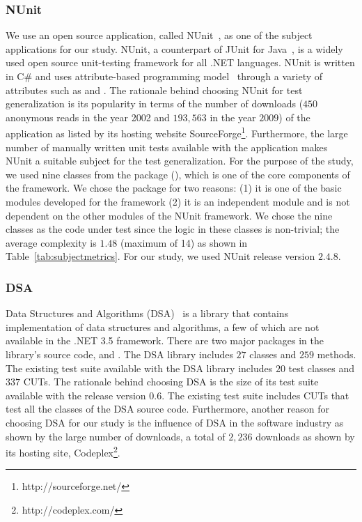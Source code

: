 \subsubsection{NUnit}
\label{sec:nunit}
We use an open source application, called NUnit~\cite{nunit}, as one of the subject applications for our study. NUnit, a counterpart of JUnit for Java~\cite{JUnit}, is a widely used open source unit-testing framework for all .NET languages. NUnit is written in C\# and uses attribute-based programming model~\cite{TDD} through a variety of attributes such as \CodeIn{[TestFixture]} and \CodeIn{[Test]}. The rationale behind choosing NUnit for test generalization is its popularity in terms of the number of downloads ($450$ anonymous reads in the year 2002 and $193,563$ in the year $2009$) of the application as listed by its hosting website SourceForge\footnote{http://sourceforge.net/}. Furthermore, the large number of manually written unit tests available with the application makes NUnit a suitable subject for the test generalization. For the purpose of the study, we used nine classes from the  package (), which is one of the core components of the framework. We chose the  package for two reasons: (1) it is one of the basic modules developed for the framework (2) it is an independent module and is not dependent on the other modules of the NUnit framework. We chose the nine classes as the code under test since the logic in these classes is non-trivial; the average complexity is $1.48$ (maximum of 14) as shown in Table~\ref{tab:subjectmetrics}. For our study, we used NUnit release version $2.4.8$. 

\subsubsection{DSA}

Data Structures and Algorithms (DSA)~\cite{dsa} is a library that contains implementation of data structures and algorithms, a few of which are not available in the .NET 3.5 framework. There are two major packages in the library's source code,  and . The DSA library includes $27$ classes and $259$ methods. The existing test suite available with the DSA library includes $20$ test classes and $337$ CUTs. The rationale behind choosing DSA is the size of its test suite available with the release version $0.6$. The existing test suite includes CUTs that test all the classes of the DSA source code. Furthermore, another reason for choosing DSA for our study is the influence of DSA in the software industry as shown by the large number of downloads, a total of $2,236$ downloads as shown by its hosting site, Codeplex\footnote{http://codeplex.com/}. 

